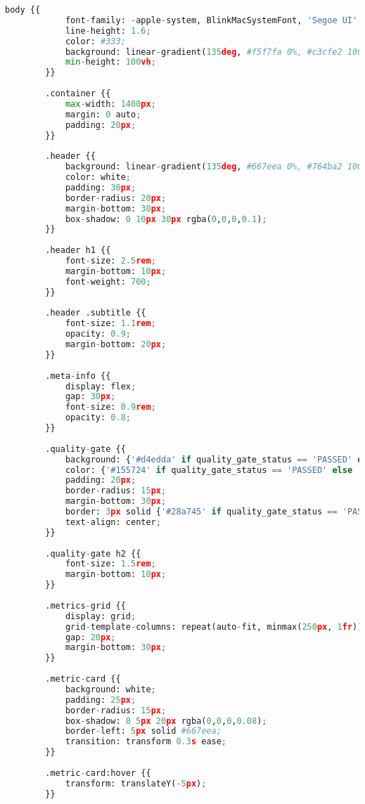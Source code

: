 \begin{lstlisting}[language=python, caption={Contenido completo del script ai\_analyzer.py.}, label={lst:python_script}]
        body {{
            font-family: -apple-system, BlinkMacSystemFont, 'Segoe UI', Roboto, Oxygen, Ubuntu, Cantarell, sans-serif;
            line-height: 1.6;
            color: #333;
            background: linear-gradient(135deg, #f5f7fa 0%, #c3cfe2 100%);
            min-height: 100vh;
        }}
        
        .container {{
            max-width: 1400px;
            margin: 0 auto;
            padding: 20px;
        }}
        
        .header {{
            background: linear-gradient(135deg, #667eea 0%, #764ba2 100%);
            color: white;
            padding: 30px;
            border-radius: 20px;
            margin-bottom: 30px;
            box-shadow: 0 10px 30px rgba(0,0,0,0.1);
        }}
        
        .header h1 {{
            font-size: 2.5rem;
            margin-bottom: 10px;
            font-weight: 700;
        }}
        
        .header .subtitle {{
            font-size: 1.1rem;
            opacity: 0.9;
            margin-bottom: 20px;
        }}
        
        .meta-info {{
            display: flex;
            gap: 30px;
            font-size: 0.9rem;
            opacity: 0.8;
        }}
        
        .quality-gate {{
            background: {'#d4edda' if quality_gate_status == 'PASSED' else '#f8d7da'};
            color: {'#155724' if quality_gate_status == 'PASSED' else '#721c24'};
            padding: 20px;
            border-radius: 15px;
            margin-bottom: 30px;
            border: 3px solid {'#28a745' if quality_gate_status == 'PASSED' else '#dc3545'};
            text-align: center;
        }}
        
        .quality-gate h2 {{
            font-size: 1.5rem;
            margin-bottom: 10px;
        }}
        
        .metrics-grid {{
            display: grid;
            grid-template-columns: repeat(auto-fit, minmax(250px, 1fr));
            gap: 20px;
            margin-bottom: 30px;
        }}
        
        .metric-card {{
            background: white;
            padding: 25px;
            border-radius: 15px;
            box-shadow: 0 5px 20px rgba(0,0,0,0.08);
            border-left: 5px solid #667eea;
            transition: transform 0.3s ease;
        }}
        
        .metric-card:hover {{
            transform: translateY(-5px);
        }}
        

\end{lstlisting}
